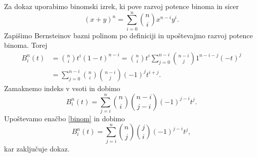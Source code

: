\documentclass[mat1]{fmfdelo}
\begin{document}
\begin{dokaz}
	Za dokaz uporabimo binomski izrek, ki pove razvoj potence binoma in sicer
	\begin{equation*}
		\left(x + y\right)^n = \sum_{i=0}^n \binom{n}{i}x^{n-i}y^i.
	\end{equation*}
	Zapišimo Bernsteinov bazni polinom po definiciji in upoštevajmo razvoj potence binoma. Torej
	\begin{equation*}
	\begin{split}
	B_i^n(t) &= \binom{n}{i}t^i\left(1-t\right)^{n-i} = \binom{n}{i}t^i \sum_{j=0}^{n-i} \binom{n-i}{j}1^{n-i-j}(-t)^j \\
	&= \sum_{j=0}^{n-i} \binom{n}{i} \binom{n-i}{j} (-1)^j t^{i+j}.
	\end{split}
	\end{equation*}
	Zamaknemo indeks v vsoti in dobimo
	\begin{equation*}
		B_i^n(t) = \sum_{j=i}^{n} \binom{n}{i} \binom{n-i}{j-i} (-1)^{j-i} t^{j}.
	\end{equation*}
	Upoštevamo enačbo \ref{binom} in dobimo
	\begin{equation*}
		B_i^n(t) = \sum_{j=i}^n \binom{n}{j} \binom{j}{i} (-1)^{j-i} t^j,
	\end{equation*}
	kar zaključuje dokaz.
\end{dokaz}
\end{document}

